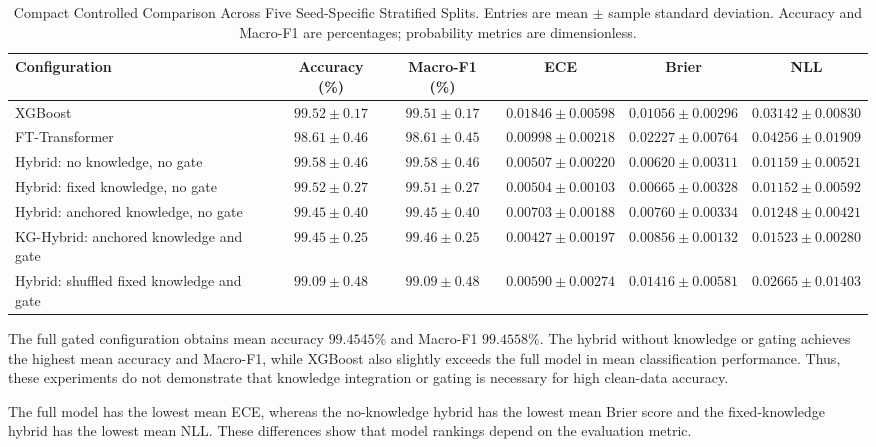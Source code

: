 \begin{table}[t]
\centering
\caption{Compact Controlled Comparison Across Five Seed-Specific
Stratified Splits. Entries are mean $\pm$ sample standard deviation.
Accuracy and Macro-F1 are percentages; probability metrics are
dimensionless.}
\label{tab:compact_comparison}
\footnotesize
\setlength{\tabcolsep}{5pt}
\begin{tabular}{lccccc}
\hline
Configuration
& Accuracy (\%)
& Macro-F1 (\%)
& ECE
& Brier
& NLL \\
\hline
XGBoost
& $99.52\pm0.17$
& $99.51\pm0.17$
& $0.01846\pm0.00598$
& $0.01056\pm0.00296$
& $0.03142\pm0.00830$ \\

FT-Transformer
& $98.61\pm0.46$
& $98.61\pm0.45$
& $0.00998\pm0.00218$
& $0.02227\pm0.00764$
& $0.04256\pm0.01909$ \\

Hybrid: no knowledge, no gate
& $99.58\pm0.46$
& $99.58\pm0.46$
& $0.00507\pm0.00220$
& $0.00620\pm0.00311$
& $0.01159\pm0.00521$ \\

Hybrid: fixed knowledge, no gate
& $99.52\pm0.27$
& $99.51\pm0.27$
& $0.00504\pm0.00103$
& $0.00665\pm0.00328$
& $0.01152\pm0.00592$ \\

Hybrid: anchored knowledge, no gate
& $99.45\pm0.40$
& $99.45\pm0.40$
& $0.00703\pm0.00188$
& $0.00760\pm0.00334$
& $0.01248\pm0.00421$ \\

KG-Hybrid: anchored knowledge and gate
& $99.45\pm0.25$
& $99.46\pm0.25$
& $0.00427\pm0.00197$
& $0.00856\pm0.00132$
& $0.01523\pm0.00280$ \\

Hybrid: shuffled fixed knowledge and gate
& $99.09\pm0.48$
& $99.09\pm0.48$
& $0.00590\pm0.00274$
& $0.01416\pm0.00581$
& $0.02665\pm0.01403$ \\
\hline
\end{tabular}
\end{table}

The full gated configuration obtains mean accuracy
$99.4545\%$ and Macro-F1 $99.4558\%$.
The hybrid without knowledge or gating achieves the highest mean
accuracy and Macro-F1, while XGBoost also slightly exceeds the full
model in mean classification performance. Thus, these experiments
do not demonstrate that knowledge integration or gating is necessary
for high clean-data accuracy.

The full model has the lowest mean ECE, whereas the no-knowledge
hybrid has the lowest mean Brier score and the fixed-knowledge hybrid
has the lowest mean NLL. These differences show that model rankings
depend on the evaluation metric.

